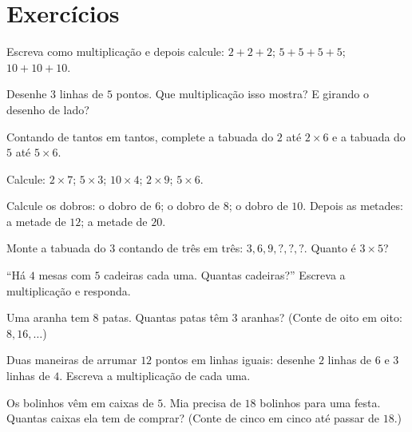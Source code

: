 \section{Exercícios}

\begin{exercise}[$\star$]\label{exo:g2:mult:1}
Escreva como multiplicação e depois calcule: $2 + 2 + 2$; \quad
$5 + 5 + 5 + 5$; \quad $10 + 10 + 10$.
\end{exercise}

\begin{exercise}[$\star$]\label{exo:g2:mult:2}
Desenhe $3$ linhas de $5$ pontos. Que multiplicação isso mostra? E
girando o desenho de lado?
\end{exercise}

\begin{exercise}[$\star$]\label{exo:g2:mult:3}
Contando de tantos em tantos, complete a tabuada do $2$ até
$2 \times 6$ e a tabuada do $5$ até $5 \times 6$.
\end{exercise}

\begin{exercise}[$\star$]\label{exo:g2:mult:4}
Calcule: $2 \times 7$; \quad $5 \times 3$; \quad $10 \times 4$;
\quad $2 \times 9$; \quad $5 \times 6$.
\end{exercise}

\begin{exercise}[$\star$]\label{exo:g2:mult:5}
Calcule os dobros: o dobro de $6$; o dobro de $8$; o dobro de $10$.
Depois as metades: a metade de $12$; a metade de $20$.
\end{exercise}

\begin{exercise}[$\star$]\label{exo:g2:mult:6}
Monte a tabuada do $3$ contando de três em três: $3, 6, 9, ?, ?, ?$.
Quanto é $3 \times 5$?
\end{exercise}

\begin{exercise}[$\star$]\label{exo:g2:mult:7}
``Há $4$ mesas com $5$ cadeiras cada uma. Quantas cadeiras?''
Escreva a multiplicação e responda.
\end{exercise}

\begin{exercise}[$\star$]\label{exo:g2:mult:8}
Uma aranha tem $8$ patas. Quantas patas têm $3$ aranhas? (Conte de
oito em oito: $8, 16, \dots$)
\end{exercise}

\begin{exercise}[$\star$]\label{exo:g2:mult:9}
Duas maneiras de arrumar $12$ pontos em linhas iguais: desenhe $2$
linhas de $6$ e $3$ linhas de $4$. Escreva a multiplicação de cada
uma.
\end{exercise}

\begin{exercise}[$\star\star$]\label{exo:g2:mult:10}
Os bolinhos vêm em caixas de $5$. Mia precisa de $18$ bolinhos para
uma festa. Quantas caixas ela tem de comprar? (Conte de cinco em
cinco até passar de $18$.)
\end{exercise}
